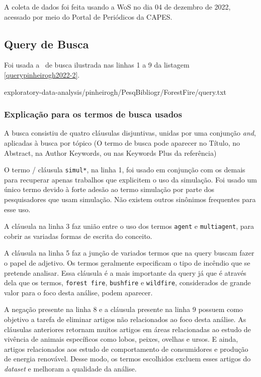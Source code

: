 A coleta de dados foi feita usando a WoS no dia 04 de dezembro de 2022, acessado por meio do Portal de Periódicos da CAPES.

\subsection{Query de Busca}

Foi usada a \query\  de busca ilustrada nas linhas 1 a 9 da listagem \ref{querypinheirogh2022-2}.


{exploratory-data-analysis/pinheirogh/PesqBibliogr/ForestFire/query.txt}

\subsubsection{Explicação para os termos de busca usados\label{pinheirogh:query}}

A busca consistiu de quatro cláusulas disjuntivas, unidas por uma conjunção \textit{and}, aplicadas à busca por tópico (O termo de busca pode aparecer no Título, no Abstract, na Author Keywords, ou nas Keywords Plus da referência)

O termo / cláusula  \texttt{simul*}, na linha 1, foi usado em conjunção com os demais para recuperar apenas trabalhos que explicitem o uso da simulação.
Foi usado um único termo devido à forte adesão ao termo simulação por parte dos pesquisadores que usam simulação. Não existem outros sinônimos frequentes para esse uso.

A cláusula na linha 3 faz união entre o uso dos termos \texttt{agent} e \texttt{multiagent}, para cobrir as variadas formas de escrita do conceito.

A cláusula na linha 5 faz a junção de variados termos que na query buscam fazer o papel de adjetivo. Os termos geralmente especificam o tipo de incêndio que se pretende analisar. Essa cláusula é a mais importante da query já que é através dela que os termos, \texttt{forest fire}, \texttt{bushfire} e \texttt{wildfire}, considerados de grande valor para o foco desta análise, podem aparecer.

A negação presente na linha 8 e a cláusula presente na linha 9 possuem como objetivo a tarefa de eliminar artigos não relacionados ao foco desta análise. As cláusulas anteriores retornam muitos artigos em áreas relacionadas ao estudo de vivência de animais específicos como lobos, peixes, ovelhas e ursos. E ainda, artigos relacionados aos estudo de comportamento de consumidores e produção de energia renovável. Desse modo, os termos escolhidos excluem esses artigos do \textit{dataset} e melhoram a qualidade da análise. 

